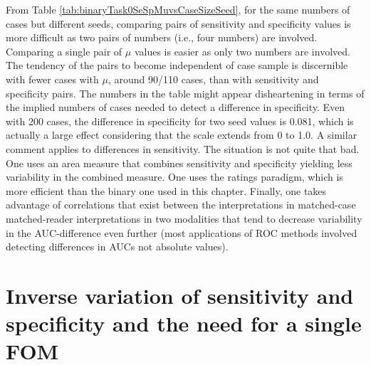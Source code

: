 \documentclass[
]{book}
\begin{document}
From Table \ref{tab:binaryTask0SeSpMuvsCaseSizeSeed}, for the same numbers of cases but different seeds, comparing pairs of sensitivity and specificity values is more difficult as two pairs of numbers (i.e., four numbers) are involved. Comparing a single pair of \(\mu\) values is easier as only two numbers are involved. The tendency of the pairs to become independent of case sample is discernible with fewer cases with \(\mu\), around 90/110 cases, than with sensitivity and specificity pairs. The numbers in the table might appear disheartening in terms of the implied numbers of cases needed to detect a difference in specificity. Even with 200 cases, the difference in specificity for two seed values is 0.081, which is actually a large effect considering that the scale extends from 0 to 1.0. A similar comment applies to differences in sensitivity. The situation is not quite that bad. One uses an area measure that combines sensitivity and specificity yielding less variability in the combined measure. One uses the ratings paradigm, which is more efficient than the binary one used in this chapter. Finally, one takes advantage of correlations that exist between the interpretations in matched-case matched-reader interpretations in two modalities that tend to decrease variability in the AUC-difference even further (most applications of ROC methods involved detecting differences in AUCs not absolute values).

\hypertarget{inverse-variation-of-sensitivity-and-specificity-and-the-need-for-a-single-fom}{%
\section{Inverse variation of sensitivity and specificity and the need for a single FOM}\label{inverse-variation-of-sensitivity-and-specificity-and-the-need-for-a-single-fom}}
\end{document}
